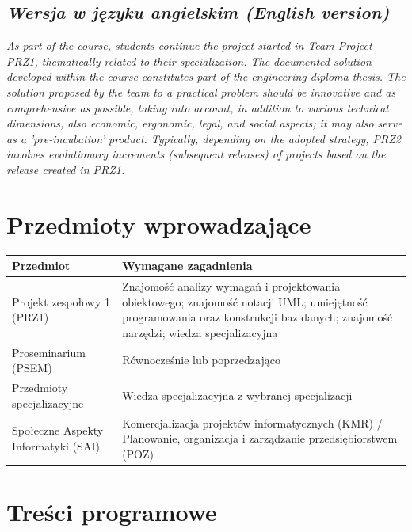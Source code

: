 \documentclass[12pt, a4paper]{article}
\newcommand{\thdrule}{\noalign{\global\setlength{\extrarowheight}{0pt}}}
\newcommand{\thdend}{\noalign{\global\setlength{\extrarowheight}{3pt}}}
\begin{document}
\subsection*{\textit{Wersja w języku angielskim (English version)}}

\textit{As part of the course, students continue the project started in Team Project PRZ1, thematically related to their specialization. The documented solution developed within the course constitutes part of the engineering diploma thesis. The solution proposed by the team to a practical problem should be innovative and as comprehensive as possible, taking into account, in addition to various technical dimensions, also economic, ergonomic, legal, and social aspects; it may also serve as a 'pre-incubation' product. Typically, depending on the adopted strategy, PRZ2 involves evolutionary increments (subsequent releases) of projects based on the release created in PRZ1.}


\section{Przedmioty wprowadzające}

{\scriptsize
\begin{tabularx}{\textwidth}{m{5cm}Y}
\thdrule\toprule
{} {\color{white}\textbf{Przedmiot}} & {\color{white}\textbf{Wymagane zagadnienia}} \\
\midrule\thdend
   Projekt zespołowy 1 (PRZ1) & Znajomość analizy wymagań i projektowania obiektowego; znajomość notacji UML; umiejętność programowania oraz konstrukcji baz danych; znajomość narzędzi; wiedza specjalizacyjna \\
   Proseminarium (PSEM) & Równocześnie lub poprzedzająco \\
   Przedmioty specjalizacyjne & Wiedza specjalizacyjna z wybranej specjalizacji \\
   Społeczne Aspekty Informatyki (SAI) & Komercjalizacja projektów informatycznych (KMR) / Planowanie, organizacja i zarządzanie przedsiębiorstwem (POZ) \\
\bottomrule
\end{tabularx}}

\section{Treści programowe}
\end{document}
